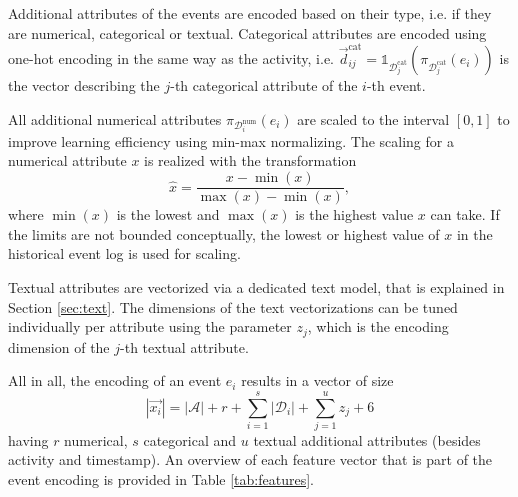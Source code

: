 Additional attributes of the events are encoded based on their type, i.e. if they are numerical, categorical or textual.
Categorical attributes are encoded using one-hot encoding in the same way as the activity, i.e. $\vec{d}_{ij}^\mathrm{cat} = \mathds{1}_{\mathcal{D}_j^{\mathrm{cat}}}(\pi_{\mathcal{D}_j^\mathrm{cat}}(e_i))$ is the vector describing the $j$-th categorical attribute of the $i$-th event.

All additional numerical attributes $\pi_{\mathcal{D}_i^\mathrm{num}} (e_i)$ are scaled to the interval $ [0, 1]$ to improve learning efficiency using min-max normalizing.
The scaling for a numerical attribute $x$ is realized with the transformation
\begin{equation*}
\hat{x} = \dfrac{x-\min(x)}{\max(x) - \min(x)},
\end{equation*}
where $\min(x)$ is the lowest and $\max(x)$ is the highest value $x$ can take.
If the limits are not bounded conceptually, the lowest or highest value of $x$ in the historical event log is used for scaling.

Textual attributes are vectorized via a dedicated text model, that is explained in Section \ref{sec:text}.
The dimensions of the text vectorizations can be tuned individually per attribute using the parameter $z_j$, which is the encoding dimension of the $j$-th textual attribute.

All in all, the encoding of an event $e_i$ results in a vector of size
\begin{equation*}
|\vec{x_i}|= |\mathcal{A}| + r + \sum_{i=1}^{s} |\mathcal{D}_i| + \sum_{j=1}^{u} z_j + 6
\end{equation*}
having $r$ numerical, $s$ categorical and $u$ textual additional attributes (besides activity and timestamp).
An overview of each feature vector that is part of the event encoding is provided in Table \ref{tab:features}.

